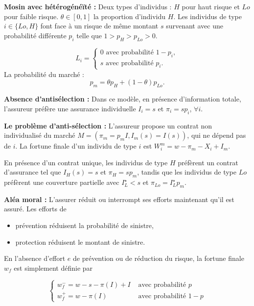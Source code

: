 \begin{f}
	
	\textbf{Mosin avec hétérogénéïté :} Deux types d'individus : $H$ pour haut risque et $Lo$ pour faible risque. $\theta \in[0,1]$ la proportion d'individu $H$. Les individus de type $i \in\{Lo, H\}$ font face à un risque de même montant $s$  survenant avec une probabilité différente $p_{i}$ telle que $1>p_{H}>p_{Lo}>0$.
	
	$$
	L_{i}=\left\{\begin{array}{l}
		0 \text { avec probabilité } 1-p_{i}, \\
		s \text { avec probabilité } p_{i} .
	\end{array}\right.
	$$
La probabilité du marché :
	$$
	p_{m}=\theta p_{H}+(1-\theta) p_{Lo} .
	$$
\medskip

\textbf{Absence d'antisélection :}  Dans ce modèle, en présence d'information totale, l'assureur préfère une assurance individuelle $I_{i}=s$ et $\pi_{i}=s p_{i}$, $\forall i$.

\textbf{Le problème d'anti-sélection : }
L'assureur propose un  contrat non individualisé du marché $M=\left(\pi_{m}=p_{m} I, I_{m}(s)=I(s)\right)$, qui ne dépend pas de $i$. La fortune finale d'un individu de type $i$ est $W_{i}^{m}=w-\pi_{m}-X_{i}+I_{m}$.

En présence d'un contrat unique, les individus de type $H$ préfèrent un contrat d'assurance tel que $I_{H}(s)=s$  et $\pi_{H}=s p_{m}$, tandis que les individus de type $Lo$ préfèrent une couverture partielle avec $I_{L}^{\star}<s$ et $\pi_{Lo}=I_{L}^{\star} p_{m}$.
\medskip

\textbf{Aléa moral :}
L'assurer réduit ou interrompt ses efforts maintenant qu'il est assuré. Les efforts de
\begin{itemize}
	\item prévention réduisent la probabilité de sinistre,
	\item protection réduisent le montant de sinistre.
\end{itemize}

 En l'absence d'effort $e$ de prévention ou de réduction du risque, la fortune finale $w_{f}$ est simplement définie par

$$
\begin{cases}w_{f}^{-}=w-s-\pi(I)+I & \text { avec probabilité } p \\ w_{f}^{+}=w-\pi(I) & \text { avec probabilité } 1-p\end{cases}
$$


\end{f}
